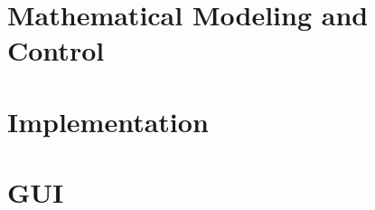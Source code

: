 \documentclass[11pt, twoside]{report}
\begin{document}
\pagestyle{fancy}
\fancyhf{}
\fancyhead[LO,RE]{\thepage}
\renewcommand{\headrulewidth}{0.4pt}


\newpage
\thispagestyle{fancy} \cleardoublepage

\tableofcontents
\cleardoublepage
\setcounter{page}{1}
\addtolength{\parskip}{12pt} %

\thispagestyle{empty}
\listoffigures
\listoftables
\lstlistoflistings


\chapter{Mathematical Modeling and Control}

\newpage

\newpage

\newpage


\chapter{Implementation}
\newpage

\newpage

\newpage

\newpage

\newpage





\chapter{GUI}
\newpage

%

%
%	

%
%
\end{document}
